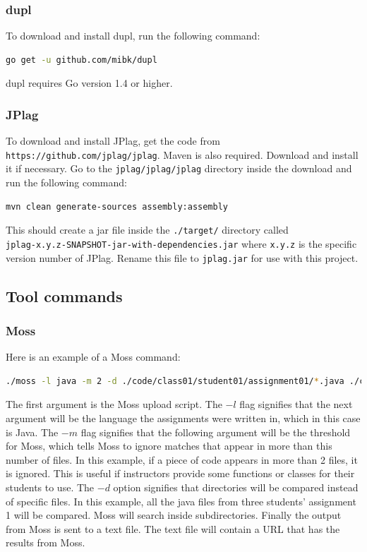 \documentclass[12pt]{article}
\begin{document}
			\subsubsection{dupl}
			To download and install dupl, run the following command:
			\begin{lstlisting}[language=bash]
	go get -u github.com/mibk/dupl
			\end{lstlisting}
			\noindent dupl requires Go version 1.4 or higher.
			
			\subsubsection{JPlag}
			To download and install JPlag, get the code from \\\verb|https://github.com/jplag/jplag|. Maven is also required. Download and install it if necessary. Go to the \verb|jplag/jplag/jplag| directory inside the download and run the following command:
			\begin{lstlisting}[language=bash]
	mvn clean generate-sources assembly:assembly
			\end{lstlisting}
			This should create a jar file inside the \verb|./target/| directory called \\\verb|jplag-x.y.z-SNAPSHOT-jar-with-dependencies.jar| where \verb|x.y.z| is the specific version number of JPlag. Rename this file to \verb|jplag.jar| for use with this project.
			
		\subsection{Tool commands}
			\subsubsection{Moss}
			Here is an example of a Moss command:
			\begin{lstlisting}[language=bash, breaklines=true]
./moss -l java -m 2 -d ./code/class01/student01/assignment01/*.java ./code/class01/student02/assignment01/*.java ./code/class01/student03/assignment01/*.java > assignment01.txt &
			\end{lstlisting}
			\noindent The first argument is the Moss upload script. The $-l$ flag signifies that the next argument will be the language the assignments were written in, which in this case is Java. The $-m$ flag signifies that the following argument will be the threshold for Moss, which tells Moss to ignore matches that appear in more than this number of files. In this example, if a piece of code appears in more than 2 files, it is ignored. This is useful if instructors provide some functions or classes for their students to use. The $-d$ option signifies that directories will be compared instead of specific files. In this example, all the java files from three students' assignment 1 will be compared. Moss will search inside subdirectories. Finally the output from Moss is sent to a text file. The text file will contain a URL that has the results from Moss.
			
\end{document}

